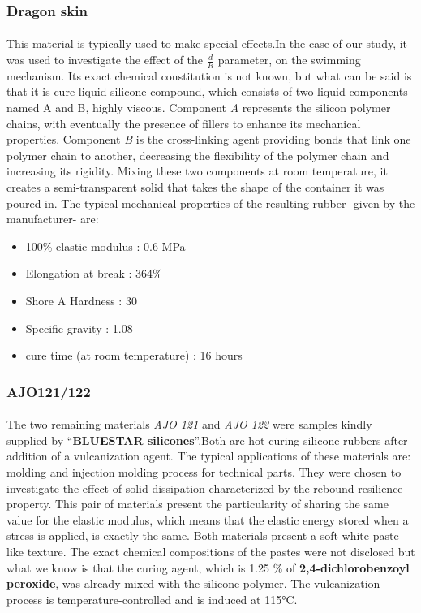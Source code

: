 \subsubsection{Dragon skin} 
\paragraph{}
This material is typically used to make special effects.In the case of our study, it was used to investigate the effect of the $\frac{d}{R}$ parameter, on the swimming mechanism. Its exact chemical constitution is not known, but what can be said is that it is cure liquid silicone compound, which consists of two liquid components named A and B, highly viscous. Component \emph{A} represents the silicon polymer chains, with eventually the presence of fillers to enhance its mechanical properties. Component \emph{B} is the cross-linking agent providing bonds that link one polymer chain to another, decreasing the flexibility of the polymer chain and increasing its rigidity. Mixing these two components at room temperature, it creates a semi-transparent solid that takes the shape of the container it was poured in.
The typical mechanical properties of the resulting rubber -given by the manufacturer- are:
\begin{itemize}
	\item 100\% elastic modulus : 0.6 MPa
	\item Elongation at break : 364\%
	\item Shore A Hardness : 30 
	\item Specific gravity : 1.08 
	\item cure time (at room temperature) : 16 hours
\end{itemize}

\subsubsection{AJO121/122}
\paragraph{}
The two remaining materials \emph{AJO 121} and \emph{AJO 122} were samples kindly supplied by "`\textbf{BLUESTAR silicones\textcopyright}"'.Both are hot curing silicone rubbers after addition of a vulcanization agent. The typical applications of these materials are: molding and injection molding process for technical parts. They were chosen to investigate the effect of solid dissipation characterized by the rebound resilience property. This pair of materials present the particularity of sharing the same value for the elastic modulus, which means that the elastic energy stored when a stress is applied, is exactly the same. Both materials present a soft white paste-like texture. The exact chemical compositions of the pastes were not disclosed but what we know is that the curing agent, which is 1.25 \% of \textbf{2,4-dichlorobenzoyl peroxide}, was already mixed with the silicone polymer. The vulcanization process is temperature-controlled and is induced at 115°C.\\

